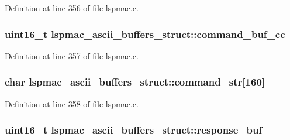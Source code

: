 Definition at line 356 of file lspmac.\-c.

\hypertarget{structlspmac__ascii__buffers__struct_a4d11efeb1eef407d811d3f9b774adc54}{
\subsubsection[{command\-\_\-buf\-\_\-cc}]{\setlength{\rightskip}{0pt plus 5cm}uint16\-\_\-t lspmac\-\_\-ascii\-\_\-buffers\-\_\-struct\-::command\-\_\-buf\-\_\-cc}}\label{structlspmac__ascii__buffers__struct_a4d11efeb1eef407d811d3f9b774adc54}


Definition at line 357 of file lspmac.\-c.

\hypertarget{structlspmac__ascii__buffers__struct_abe6a433dd9be4781dbf7e31d16484a4b}{
\subsubsection[{command\-\_\-str}]{\setlength{\rightskip}{0pt plus 5cm}char lspmac\-\_\-ascii\-\_\-buffers\-\_\-struct\-::command\-\_\-str\mbox{[}160\mbox{]}}}\label{structlspmac__ascii__buffers__struct_abe6a433dd9be4781dbf7e31d16484a4b}


Definition at line 358 of file lspmac.\-c.

\hypertarget{structlspmac__ascii__buffers__struct_ae1d37cf9568478c9d8dad540ce77183c}{
\subsubsection[{response\-\_\-buf}]{\setlength{\rightskip}{0pt plus 5cm}uint16\-\_\-t lspmac\-\_\-ascii\-\_\-buffers\-\_\-struct\-::response\-\_\-buf}}\label{structlspmac__ascii__buffers__struct_ae1d37cf9568478c9d8dad540ce77183c}


